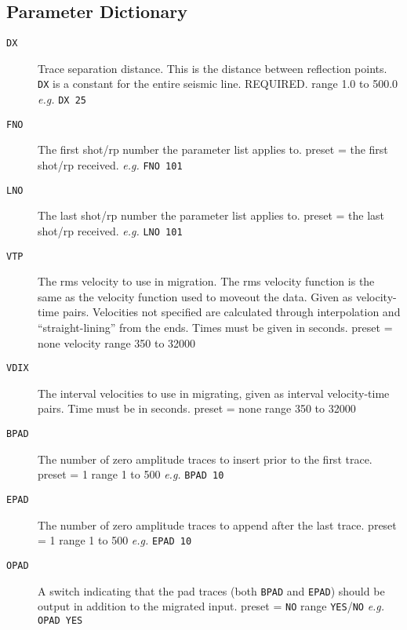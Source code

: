 \subsection{Parameter Dictionary}

\begin{description}
\item[\texttt{DX}] Trace separation distance.  This is the distance between
         reflection points.  \texttt{DX} is a constant for the entire seismic line.
         REQUIRED.  range 1.0 to 500.0 \textit{e.g.}  \texttt{DX 25}

\item[\texttt{FNO}] The first \gls{shot}/\gls{rp} number the parameter list applies to.
         \Gls{preset} = the first \gls{shot}/\gls{rp} received.    \textit{e.g.}   \texttt{FNO 101}

\item[\texttt{LNO}] The last \gls{shot}/\gls{rp} number the parameter list applies to.
         \Gls{preset} = the last \gls{shot}/\gls{rp} received.     \textit{e.g.}   \texttt{LNO 101}

\item[\texttt{VTP}] The rms velocity to use in migration.  The rms velocity function
         is the same as the velocity function used to moveout the data.
         Given as velocity-time pairs.  Velocities not specified are
         calculated through interpolation and ``straight-lining'' from the
         ends.  Times must be given in seconds.
         \Gls{preset} = none    velocity range 350 to 32000

\item[\texttt{VDIX}] The interval velocities to use in migrating, given as interval
         velocity-time pairs.  Time must be in seconds.
         \Gls{preset} = none    range 350 to 32000

\item[\texttt{BPAD}] The number of zero amplitude traces to insert prior to the first
         trace.
         \Gls{preset} = 1   range 1 to 500   \textit{e.g.} \texttt{BPAD 10}

\item[\texttt{EPAD}] The number of zero amplitude traces to append after the last trace.
    \Gls{preset} = 1   range 1 to 500   \textit{e.g.} \texttt{EPAD 10}

\item[\texttt{OPAD}] A switch indicating that the pad traces (both \texttt{BPAD} and \texttt{EPAD})
         should be output in addition to the migrated input.
         \Gls{preset} = \texttt{NO}   range \texttt{YES}/\texttt{NO}    \textit{e.g.}   \texttt{OPAD YES}


\end{description}

